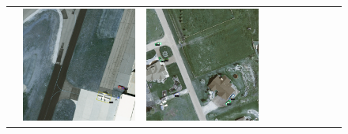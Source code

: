 \begin{figure}[H]
\begin{tabularx}{\textwidth}{c|*{9}{X}}
    &  \includegraphics[trim={650pt 120pt 170pt 720pt},clip,width=\linewidth]{images/015Results/02perm_exp/comp_images/rgbir/487.png}
    & \includegraphics[trim={230pt 200pt 680pt 725pt},clip,width=\linewidth]{images/015Results/02perm_exp/comp_images/rgbir/509.png}

\end{tabularx}
\end{figure}

